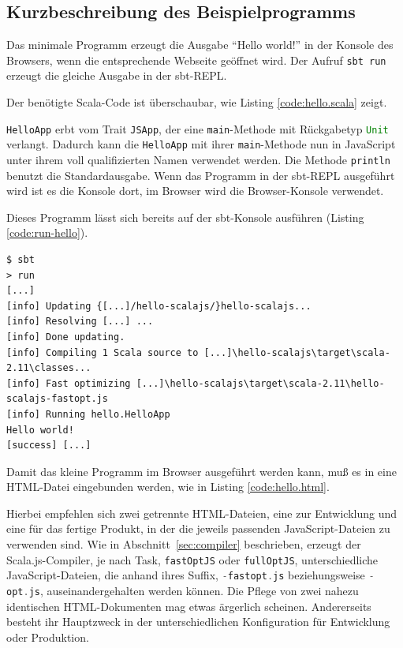 \documentclass[a4paper, 12pt, hidelinks, listof=totoc, listoftables=totoc, bibliography=totoc]{scrreprt}
\newcommand{\code}[1]{\lstinline[language=Scala, style=inline]|#1|}
\newcommand{\scala}[1]{\lstinline[language=Scala, style=inline]|#1|}
\begin{document}
\subsection{Kurzbeschreibung des Beispielprogramms}

Das minimale Programm erzeugt die Ausgabe "`Hello world!"' in der Konsole des Browsers, wenn die entsprechende Webseite geöffnet wird. Der Aufruf \code{sbt run} erzeugt die gleiche Ausgabe in der sbt-REPL.

Der benötigte Scala-Code ist überschaubar, wie Listing \ref{code:hello.scala} zeigt.



\scala{HelloApp} erbt vom Trait \scala{JSApp}, der eine \scala{main}-Methode mit Rückgabetyp \scala{Unit} verlangt. Dadurch kann die \scala{HelloApp} mit ihrer \scala{main}-Methode nun in JavaScript unter ihrem voll qualifizierten Namen verwendet werden. Die Methode \scala{println} benutzt die Standardausgabe. Wenn das Programm in der sbt-REPL ausgeführt wird ist es die Konsole dort, im Browser wird die Browser-Konsole verwendet.

Dieses Programm lässt sich bereits auf der sbt-Konsole ausführen (Listing \ref{code:run-hello}).

\begin{lstlisting}[caption={Lauf des Hallo-Welt-Programms in der sbt-REPL.}, label={code:run-hello}]
$ sbt
> run
[...]
[info] Updating {[...]/hello-scalajs/}hello-scalajs...
[info] Resolving [...] ...
[info] Done updating.
[info] Compiling 1 Scala source to [...]\hello-scalajs\target\scala-2.11\classes...
[info] Fast optimizing [...]\hello-scalajs\target\scala-2.11\hello-scalajs-fastopt.js
[info] Running hello.HelloApp
Hello world!
[success] [...]
\end{lstlisting}

Damit das kleine Programm im Browser ausgeführt werden kann, muß es in eine HTML-Datei eingebunden werden, wie in Listing \ref{code:hello.html}.



Hierbei empfehlen sich zwei getrennte HTML-Dateien, eine zur Entwicklung und eine für das fertige Produkt, in der die jeweils passenden JavaScript-Dateien zu verwenden sind. Wie in Abschnitt~\ref{sec:compiler} beschrieben, erzeugt der Scala.js-Compiler, je nach Task, \code{fastOptJS} oder \code{fullOptJS}, unterschiedliche JavaScript-Dateien, die anhand ihres Suffix, \code{-fastopt.js} beziehungsweise \code{-opt.js}, auseinandergehalten werden können. Die Pflege von zwei nahezu identischen HTML-Dokumenten mag etwas ärgerlich scheinen. Andererseits besteht ihr Hauptzweck in der unterschiedlichen Konfiguration für Entwicklung oder Produktion.
\end{document}

